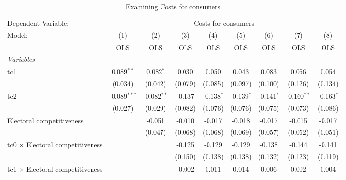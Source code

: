 
\begin{table}[htbp]
   \caption{Examining Costs for consumers}
   \centering
   \begin{tabular}{lcccccccc}
      \toprule
      Dependent Variable: & \multicolumn{8}{c}{Costs for consumers}\\
      Model:                                  & (1)            & (2)           & (3)     & (4)          & (5)          & (6)          & (7)           & (8)\\  
                                              &  OLS           & OLS           & OLS     & OLS          & OLS          & OLS          & OLS           & OLS\\  
      \midrule
      \emph{Variables}\\
      tc1                                     & 0.089$^{**}$   & 0.082$^{*}$   & 0.030   & 0.050        & 0.043        & 0.083        & 0.056         & 0.054\\   
                                              & (0.034)        & (0.042)       & (0.079) & (0.085)      & (0.097)      & (0.100)      & (0.126)       & (0.134)\\   
      tc2                                     & -0.089$^{***}$ & -0.082$^{**}$ & -0.137  & -0.138$^{*}$ & -0.139$^{*}$ & -0.141$^{*}$ & -0.160$^{**}$ & -0.163$^{*}$\\   
                                              & (0.027)        & (0.029)       & (0.082) & (0.076)      & (0.076)      & (0.075)      & (0.073)       & (0.086)\\   
      Electoral competitiveness               &                & -0.051        & -0.010  & -0.017       & -0.018       & -0.017       & -0.015        & -0.017\\   
                                              &                & (0.047)       & (0.068) & (0.068)      & (0.069)      & (0.057)      & (0.052)       & (0.051)\\   
      tc0 $\times$ Electoral competitiveness  &                &               & -0.125  & -0.129       & -0.129       & -0.138       & -0.144        & -0.141\\   
                                              &                &               & (0.150) & (0.138)      & (0.138)      & (0.132)      & (0.123)       & (0.119)\\   
      tc1 $\times$ Electoral competitiveness  &                &               & -0.002  & 0.011        & 0.014        & 0.006        & 0.002         & 0.004\\   

\end{tabular}
\end{table}
